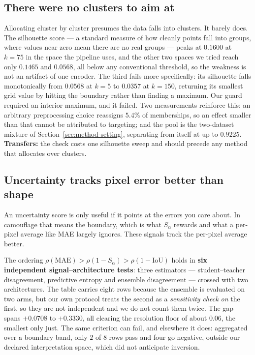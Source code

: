 \documentclass{article} %
\begin{document}
\subsection{There were no clusters to aim at}
\label{sec:diss-structure}

Allocating cluster by cluster presumes the data falls into clusters. It barely does. The silhouette
score --- a standard measure of how cleanly points fall into groups, where values near zero mean
there are no real groups --- peaks at $0.1600$ at $k = 75$ in the space the pipeline uses, and the
other two spaces we tried reach only $0.1465$ and $0.0568$, all below any conventional threshold, so
the weakness is not an artifact of one encoder. The third fails more specifically: its silhouette
falls monotonically from $0.0568$ at $k=5$ to $0.0357$ at $k=150$, returning its smallest grid value
by hitting the boundary rather than finding a maximum. Our guard required an interior maximum, and
it failed. Two measurements reinforce this: an arbitrary preprocessing choice reassigns $5.4\%$ of
memberships, so an effect smaller than that cannot be attributed to targeting; and the pool is the
two-dataset mixture of Section~\ref{sec:method-setting}, separating from itself at up to $0.9225$.
\textbf{Transfers:} the check costs one silhouette sweep and should precede any method that allocates
over clusters.

\subsection{Uncertainty tracks pixel error better than shape}
\label{sec:diss-ordering}

An uncertainty score is only useful if it points at the errors you care about. In camouflage that
means the boundary, which is what $S_\alpha$ rewards and what a per-pixel average like MAE largely
ignores. These signals track the per-pixel average better.

The ordering $\rho(\mathrm{MAE}) > \rho(1-S_\alpha) > \rho(1-\mathrm{IoU})$ holds in \textbf{six
independent signal--architecture tests}: three estimators --- student--teacher disagreement,
predictive entropy and ensemble disagreement --- crossed with two architectures. The table carries
eight rows because the ensemble is evaluated on two arms, but our own protocol treats the second as
a \emph{sensitivity check on} the first, so they are not independent and we do not count them twice.
The gap spans $+0.0708$ to $+0.3330$, all clearing the resolution floor of about $0.06$, the
smallest only just. The same criterion can fail, and elsewhere it does: aggregated over a boundary
band, only $2$ of $8$ rows pass and four go negative, outside our declared interpretation space,
which did not anticipate inversion.
\end{document}
